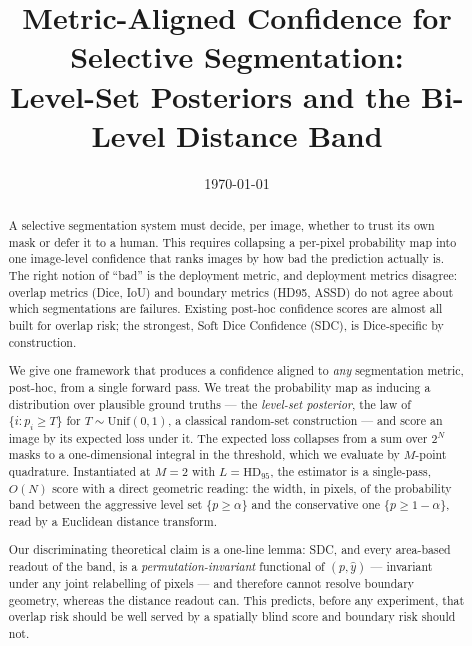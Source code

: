 \documentclass[11pt]{article}
\title{Metric-Aligned Confidence for Selective Segmentation:\\
Level-Set Posteriors and the Bi-Level Distance Band}
\author{}
\date{\today}
\theoremstyle{remark}
\newcommand{\HDF}{\mathrm{HD}_{95}}
\begin{document}
\maketitle

\begin{abstract}
A selective segmentation system must decide, per image, whether to trust its own
mask or defer it to a human. This requires collapsing a per-pixel probability map
into one image-level confidence that ranks images by how bad the prediction
actually is. The right notion of ``bad'' is the deployment metric, and deployment
metrics disagree: overlap metrics (Dice, IoU) and boundary metrics (HD95, ASSD)
do not agree about which segmentations are failures. Existing post-hoc confidence
scores are almost all built for overlap risk; the strongest, Soft Dice Confidence
(SDC), is Dice-specific by construction.

We give one framework that produces a confidence aligned to \emph{any}
segmentation metric, post-hoc, from a single forward pass. We treat the
probability map as inducing a distribution over plausible ground truths --- the
\emph{level-set posterior}, the law of $\{i : p_i \ge T\}$ for
$T\sim\mathrm{Unif}(0,1)$, a classical random-set construction --- and score an
image by its expected loss under it. The expected loss collapses from a sum over
$2^N$ masks to a one-dimensional integral in the threshold, which we evaluate by
$M$-point quadrature. Instantiated at $M=2$ with $L=\HDF$, the estimator is a
single-pass, $O(N)$ score with a direct geometric reading: the width, in pixels,
of the probability band between the aggressive level set $\{p\ge\alpha\}$ and the
conservative one $\{p\ge 1-\alpha\}$, read by a Euclidean distance transform.

Our discriminating theoretical claim is a one-line lemma: SDC, and every
area-based readout of the band, is a \emph{permutation-invariant} functional of
$(p,\hat y)$ --- invariant under any joint relabelling of pixels --- and therefore
cannot resolve boundary geometry, whereas the distance readout can. This predicts,
before any experiment, that overlap risk should be well served by a spatially blind
score and boundary risk should not.


\end{abstract}
\end{document}
